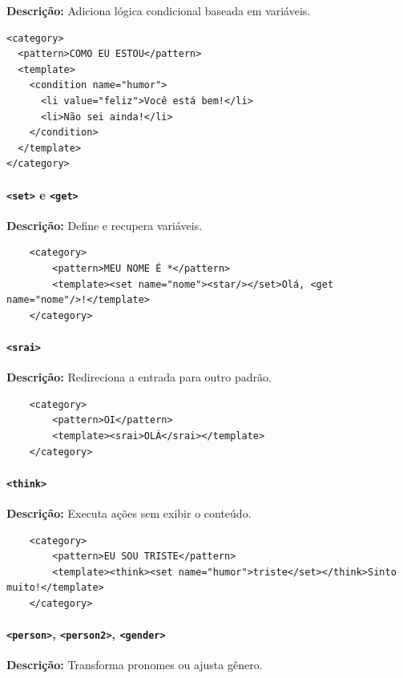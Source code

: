 \documentclass[14pt,a4paper,oneside]{book}
\begin{document}
\textbf{Descrição:} Adiciona lógica condicional baseada em variáveis. 

\begin{verbatim}
<category>
  <pattern>COMO EU ESTOU</pattern>
  <template>
    <condition name="humor">
      <li value="feliz">Você está bem!</li>
      <li>Não sei ainda!</li>
    </condition>
  </template>
</category>
\end{verbatim}

\paragraph{\texttt{<set>} e \texttt{<get>}} 

\textbf{Descrição:} Define e recupera variáveis. 

\begin{verbatim}
	<category>
		<pattern>MEU NOME É *</pattern>
		<template><set name="nome"><star/></set>Olá, <get name="nome"/>!</template>
	</category>
\end{verbatim}

\paragraph{\texttt{<srai>}} 

\textbf{Descrição:} Redireciona a entrada para outro padrão. 

\begin{verbatim}
	<category>
		<pattern>OI</pattern>
		<template><srai>OLÁ</srai></template>
	</category>
\end{verbatim}

\paragraph{\texttt{<think>}} 

\textbf{Descrição:} Executa ações sem exibir o conteúdo. 

\begin{verbatim}
	<category>
		<pattern>EU SOU TRISTE</pattern>
		<template><think><set name="humor">triste</set></think>Sinto muito!</template>
	</category>
\end{verbatim}

\paragraph{\texttt{<person>}, \texttt{<person2>}, \texttt{<gender>}} 

\textbf{Descrição:} Transforma pronomes ou ajusta gênero. 
\end{document}
